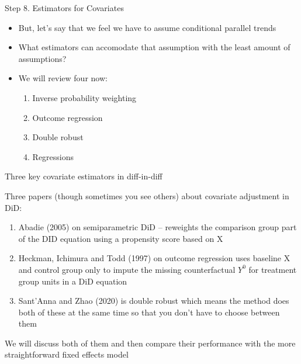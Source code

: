 \documentclass{beamer}
\begin{document}
\begin{frame}{Step 8. Estimators for Covariates}

\begin{itemize}

\item But, let's say that we feel we have to assume conditional parallel trends
\item What estimators can accomodate that assumption with the least amount of assumptions?
\item We will review four now:
	\begin{enumerate}
	\item Inverse probability weighting
	\item Outcome regression
	\item Double robust
	\item Regressions
	\end{enumerate}
\end{itemize}

\end{frame}


\begin{frame}{Three key covariate estimators in diff-in-diff}

Three papers (though sometimes you see others) about covariate adjustment in DiD:
\begin{enumerate}
\item Abadie (2005) on semiparametric DiD -- reweights the comparison group part of the DID equation using a propensity score based on X
\item Heckman, Ichimura and Todd (1997) on outcome regression uses baseline X and control group only to impute the missing counterfactual $Y^0$ for treatment group units in a DiD equation
\item Sant'Anna and Zhao (2020) is double robust which means the method does both of these at the same time so that you don't have to choose between them
\end{enumerate}

\bigskip

We will discuss both of them and then compare their performance with the more straightforward fixed effects model

\end{frame}
\end{document}
